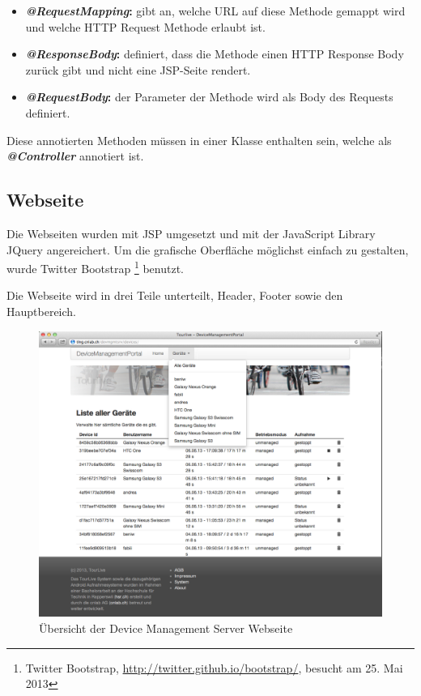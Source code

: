 \begin{itemize}
\item \textbf{\textit{@RequestMapping}:} gibt an, welche URL auf diese Methode gemappt wird und welche HTTP Request Methode erlaubt ist.
\item\textbf{\textit{@ResponseBody}: } definiert, dass die Methode einen HTTP Response Body zurück gibt und nicht eine JSP-Seite rendert.
\item\textbf{\textit{@RequestBody}: } der Parameter der Methode wird als Body des Requests definiert.
\end{itemize}
Diese annotierten Methoden müssen in einer Klasse enthalten sein, welche als \textit{\textbf{@Controller}} annotiert ist.


\subsection{Webseite}
Die Webseiten wurden mit JSP umgesetzt und mit der JavaScript Library JQuery angereichert. Um die grafische Oberfläche möglichst einfach zu gestalten, wurde  Twitter Bootstrap \footnote{Twitter Bootstrap, \url{http://twitter.github.io/bootstrap/}, besucht am 25. Mai 2013} benutzt.

Die Webseite wird in drei Teile unterteilt, Header, Footer sowie den Hauptbereich. 

\begin{figure}[H]
	\centering
	\includegraphics[width=120mm]{images/devmgmtsrv/all.png}
	\caption{Übersicht der Device Management Server Webseite}
\end{figure}

